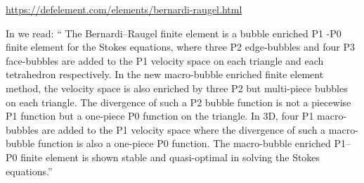 \url{https://defelement.com/elements/bernardi-raugel.html}


In \textcite{zhan23} we read: 
{\color{darkgray} ``
The Bernardi–Raugel finite element is a bubble enriched P1 -P0 finite element for the
Stokes equations, where three P2 edge-bubbles and four P3 face-bubbles are added to
the P1 velocity space on each triangle and each tetrahedron respectively. In the new
macro-bubble enriched finite element method, the velocity space is also enriched by
three P2 but multi-piece bubbles on each triangle. The divergence of such a P2 bubble
function is not a piecewise P1 function but a one-piece P0 function on the triangle. In
3D, four P1 macro-bubbles are added to the P1 velocity space where the divergence
of such a macro-bubble function is also a one-piece P0 function. The macro-bubble
enriched P1–P0 finite element is shown stable and quasi-optimal in solving the Stokes
equations.''}

